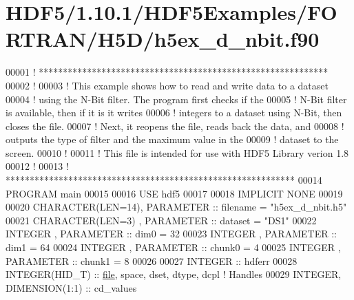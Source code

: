 \hypertarget{_h_d_f5_21_810_81_2_h_d_f5_examples_2_f_o_r_t_r_a_n_2_h5_d_2h5ex__d__nbit_8f90_source}{}\section{H\+D\+F5/1.10.1/\+H\+D\+F5\+Examples/\+F\+O\+R\+T\+R\+A\+N/\+H5\+D/h5ex\+\_\+d\+\_\+nbit.f90}
\label{_h_d_f5_21_810_81_2_h_d_f5_examples_2_f_o_r_t_r_a_n_2_h5_d_2h5ex__d__nbit_8f90_source}

\begin{DoxyCode}
00001 \textcolor{comment}{! ************************************************************}
00002 \textcolor{comment}{!}
00003 \textcolor{comment}{!  This example shows how to read and write data to a dataset}
00004 \textcolor{comment}{!  using the N-Bit filter.  The program first checks if the}
00005 \textcolor{comment}{!  N-Bit filter is available, then if it is it writes}
00006 \textcolor{comment}{!  integers to a dataset using N-Bit, then closes the file.}
00007 \textcolor{comment}{!  Next, it reopens the file, reads back the data, and}
00008 \textcolor{comment}{!  outputs the type of filter and the maximum value in the}
00009 \textcolor{comment}{!  dataset to the screen.}
00010 \textcolor{comment}{!}
00011 \textcolor{comment}{!  This file is intended for use with HDF5 Library verion 1.8}
00012 \textcolor{comment}{!}
00013 \textcolor{comment}{! ************************************************************}
00014 \textcolor{keyword}{PROGRAM} main
00015 
00016   \textcolor{keywordtype}{USE }hdf5
00017 
00018   \textcolor{keywordtype}{IMPLICIT NONE}
00019 
00020   \textcolor{keywordtype}{CHARACTER(LEN=14)}, \textcolor{keywordtype}{PARAMETER} :: filename = \textcolor{stringliteral}{"h5ex\_d\_nbit.h5"}
00021   \textcolor{keywordtype}{CHARACTER(LEN=3)} , \textcolor{keywordtype}{PARAMETER} :: dataset  = \textcolor{stringliteral}{"DS1"}
00022   \textcolor{keywordtype}{INTEGER}          , \textcolor{keywordtype}{PARAMETER} :: dim0     = 32
00023   \textcolor{keywordtype}{INTEGER}          , \textcolor{keywordtype}{PARAMETER} :: dim1     = 64
00024   \textcolor{keywordtype}{INTEGER}          , \textcolor{keywordtype}{PARAMETER} :: chunk0   = 4
00025   \textcolor{keywordtype}{INTEGER}          , \textcolor{keywordtype}{PARAMETER} :: chunk1   = 8
00026 
00027   \textcolor{keywordtype}{INTEGER} :: hdferr
00028   \textcolor{keywordtype}{INTEGER(HID\_T)}  :: \hyperlink{structfile}{file}, space, dset, dtype, dcpl \textcolor{comment}{! Handles}
00029   \textcolor{keywordtype}{INTEGER}, \textcolor{keywordtype}{DIMENSION(1:1)} :: cd\_values

\end{DoxyCode}
